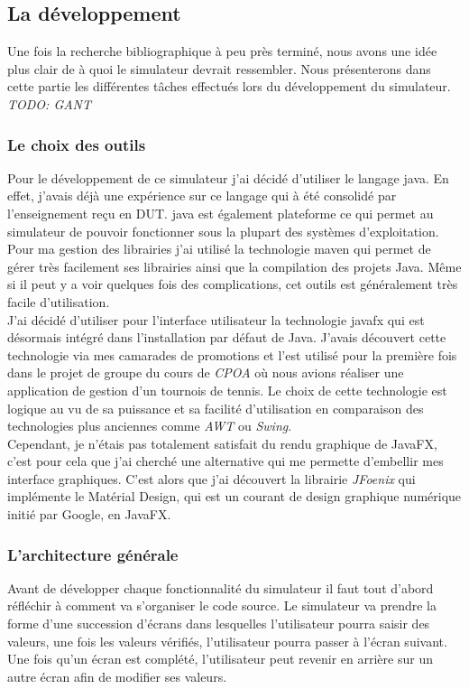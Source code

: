 \subsection{La développement}
Une fois la recherche bibliographique à peu près terminé, nous avons une idée plus clair de à quoi le simulateur devrait ressembler. Nous présenterons dans cette partie les différentes tâches effectués lors du développement du simulateur.
\emph{TODO: GANT}

\subsubsection{Le choix des outils}
Pour le développement de ce simulateur j'ai décidé d'utiliser le langage \gls{java}. En effet, j'avais déjà une expérience sur ce langage qui à été consolidé par l'enseignement reçu en DUT. \gls{java} est également plateforme ce qui permet au simulateur de pouvoir fonctionner sous la plupart des systèmes d'exploitation.\\

Pour ma gestion des librairies j'ai utilisé la technologie \gls{maven} qui permet de gérer très facilement ses librairies ainsi que la compilation des projets Java. Même si il peut y a voir quelques fois des complications, cet outils est généralement très facile d'utilisation.\\

J'ai décidé d'utiliser pour l'interface utilisateur la technologie \gls{javafx} qui est désormais intégré dans l'installation par défaut de Java. J'avais découvert cette technologie via mes camarades de promotions et l'est utilisé pour la première fois dans le projet de groupe du cours de \emph{CPOA} où nous avions réaliser une application de gestion d'un tournois de tennis. Le choix de cette technologie est logique au vu de sa puissance et sa facilité d'utilisation en comparaison des technologies plus anciennes comme \emph{AWT} ou \emph{Swing}.\\
Cependant, je n'étais pas totalement satisfait du rendu graphique de JavaFX, c'est pour cela que j'ai cherché une alternative qui me permette d'embellir mes interface graphiques. C'est alors que j'ai découvert la librairie \emph{JFoenix} qui implémente le Matérial Design, qui est un courant de design graphique numérique initié par Google, en JavaFX.

\subsubsection{L'architecture générale}
Avant de développer chaque fonctionnalité du simulateur il faut tout d'abord réfléchir à comment va s'organiser le code source. Le simulateur va prendre la forme d'une succession d'écrans dans lesquelles l'utilisateur pourra saisir des valeurs, une fois les valeurs vérifiés, l'utilisateur pourra passer à l'écran suivant. Une fois qu'un écran est complété, l'utilisateur peut revenir en arrière sur un autre écran afin de modifier ses valeurs.\\

